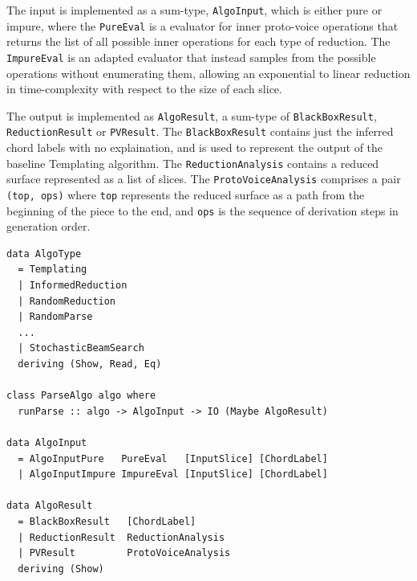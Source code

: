 \documentclass[12pt,a4paper,twoside,openany]{report} \usepackage[pdfborder={0 0 0}]{hyperref}    %
\theoremstyle{definition} \newtheorem{definition}{Definition}[section]
\begin{document}
The input is implemented as a sum-type, \texttt{AlgoInput}, which is either pure or impure, where the \texttt{PureEval} is a evaluator for inner proto-voice operations that returns the list of all possible inner operations
for each type of reduction. The \texttt{ImpureEval} is an adapted evaluator that instead samples from the possible
operations without enumerating them, allowing an exponential to linear reduction in time-complexity with respect to the
size of each slice. 

The output is implemented as \texttt{AlgoResult}, a sum-type of \texttt{BlackBoxResult},
\texttt{ReductionResult} or \texttt{PVResult}. The \texttt{BlackBoxResult} contains just the inferred chord labels with
no explaination, and is used to represent the output of the baseline Templating algorithm. 
The \texttt{ReductionAnalysis} contains a reduced surface represented as a list of slices. 
The \texttt{ProtoVoiceAnalysis} comprises a pair \texttt{(top, ops)} where \texttt{top} represents the reduced surface
as a path from the beginning of the piece to the end, and \texttt{ops} is the sequence of derivation steps in generation
order. 



\begin{lstlisting}[caption={Algorithm Module Overview}, captionpos=b] 
data AlgoType
  = Templating
  | InformedReduction 
  | RandomReduction
  | RandomParse
  ... 
  | StochasticBeamSearch
  deriving (Show, Read, Eq)

class ParseAlgo algo where 
  runParse :: algo -> AlgoInput -> IO (Maybe AlgoResult) 

data AlgoInput 
  = AlgoInputPure   PureEval   [InputSlice] [ChordLabel] 
  | AlgoInputImpure ImpureEval [InputSlice] [ChordLabel]

data AlgoResult 
  = BlackBoxResult   [ChordLabel]
  | ReductionResult  ReductionAnalysis 
  | PVResult         ProtoVoiceAnalysis
  deriving (Show)
\end{lstlisting}
\end{document}
